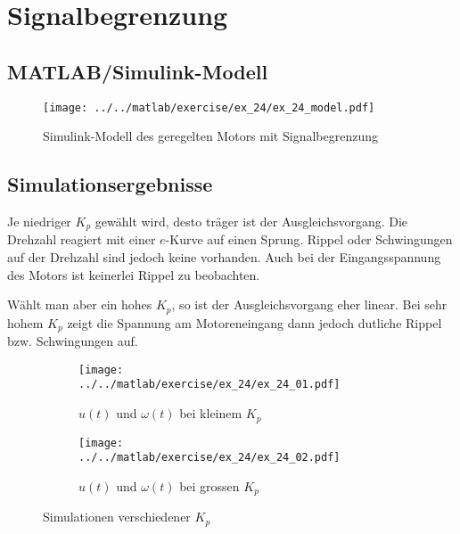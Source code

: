 \section{Signalbegrenzung}

\subsection{MATLAB/Simulink-Modell}

\begin{figure}[h!]
	\centering
	\texttt{[image: ../../matlab/exercise/ex\_24/ex\_24\_model.pdf]}
	\caption{Simulink-Modell des geregelten Motors mit Signalbegrenzung}
\end{figure}

\subsection{Simulationsergebnisse}
Je niedriger $K_p$ gewählt wird, desto träger ist der Ausgleichsvorgang.
Die Drehzahl reagiert mit einer $e$-Kurve auf einen Sprung. Rippel oder
Schwingungen auf der Drehzahl sind jedoch keine vorhanden. Auch bei der
Eingangsspannung des Motors ist keinerlei Rippel zu beobachten.

Wählt man aber ein hohes $K_p$, so ist der Ausgleichsvorgang eher linear.
Bei sehr hohem $K_p$ zeigt die Spannung am Motoreneingang dann jedoch
dutliche Rippel bzw. Schwingungen auf.

\begin{figure}[h!]
	\centering
	\begin{subfigure}{0.45\textwidth}
		\texttt{[image: ../../matlab/exercise/ex\_24/ex\_24\_01.pdf]}
		\caption{$u(t)$ und $\omega(t)$ bei kleinem $K_p$}
	\end{subfigure}
	\hfill{}
	\begin{subfigure}{0.45\textwidth}
		\texttt{[image: ../../matlab/exercise/ex\_24/ex\_24\_02.pdf]}
		\caption{$u(t)$ und $\omega(t)$ bei grossen $K_p$}
	\end{subfigure}
	\caption{Simulationen verschiedener $K_p$}
\end{figure}
